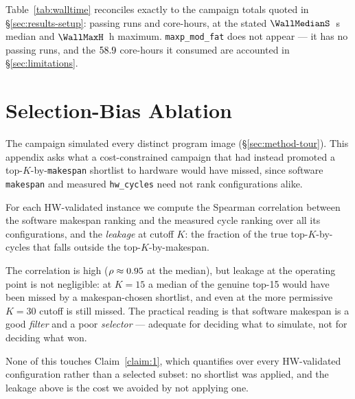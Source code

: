 \documentclass[journal,10pt]{IEEEtran}
\theoremstyle{plain}
\theoremstyle{definition}
\theoremstyle{remark}
\newcommand{\sv}[1]{\texttt{#1}}
\begin{document}
Table~\ref{tab:walltime} reconciles exactly to the campaign totals quoted in
\S\ref{sec:results-setup}: \WallTBs{} passing runs and \WallTotalH{}
core-hours, at the stated $\WallMedianS$~s median and $\WallMaxH$~h maximum.
\sv{maxp\_mod\_fat} does not appear --- it has no passing runs, and the
$58.9$ core-hours it consumed are accounted in \S\ref{sec:limitations}.

\begin{table}[!t]
\caption{Measured xsim wall-clock per instance, over passing runs only.
  ``Med.'' is the median per-testbench wall-clock, ``Max'' the longest
  single testbench.}
\label{tab:walltime}
\centering
\scriptsize
\renewcommand{\arraystretch}{1.05}
\resizebox{\columnwidth}{!}{%
%
}
\end{table}

\section{Selection-Bias Ablation}\label{app:bias}

The campaign simulated every distinct program image
(\S\ref{sec:method-tour}). This appendix asks what a cost-constrained
campaign that had instead promoted a top-$K$-by-\sv{makespan} shortlist to
hardware would have missed, since software \sv{makespan} and measured
\sv{hw\_cycles} need not rank configurations alike.

For each HW-validated instance we compute the Spearman correlation between
the software makespan ranking and the measured cycle ranking over all its
configurations, and the \emph{leakage} at cutoff $K$: the fraction of the
true top-$K$-by-cycles that falls outside the top-$K$-by-makespan.



The correlation is high ($\rho \approx 0.95$ at the median),
but leakage at the operating point is not negligible: at $K=15$ a median
\TournLeakPctFifteen{} of the genuine top-15 would have been missed by a
makespan-chosen shortlist, and even at the more permissive $K=30$ cutoff
\TournLeakPctThirty{} is still missed. The
practical reading is that software makespan is a good \emph{filter} and a
poor \emph{selector} --- adequate for deciding what to simulate, not for
deciding what won.

None of this touches Claim~\ref{claim:1}, which quantifies over every
HW-validated configuration rather than a selected subset: no shortlist was
applied, and the leakage above is the cost we avoided by not applying one.
\end{document}
